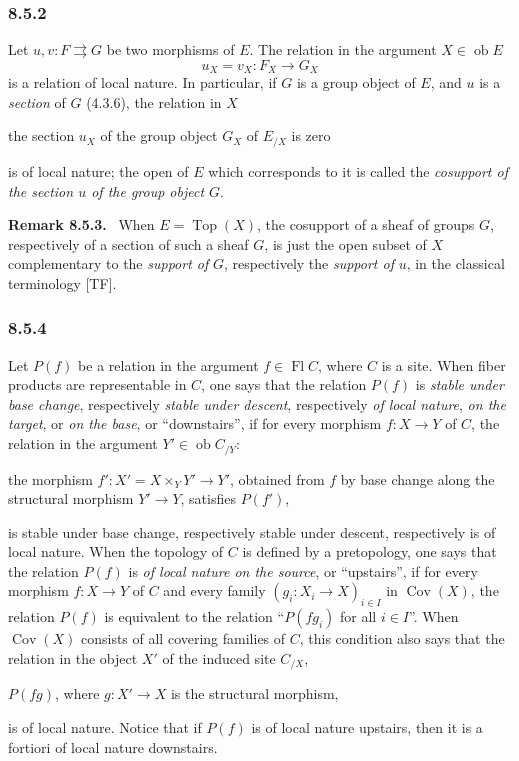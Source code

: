 \documentclass[11pt]{article}
\newcommand{\Top}{\operatorname{Top}}
\newcommand{\Cov}{\operatorname{Cov}}
\newcommand{\ob}{\operatorname{ob}}
\newenvironment{remarktext}[1]{\par\medskip\noindent\textbf{#1.}\ }{\par\medskip}
\begin{document}
\subsubsection*{8.5.2}
Let \(u,v:F\rightrightarrows G\) be two morphisms of \(E\). The relation in the argument \(X\in\ob E\)
\[
u_X=v_X:F_X\longrightarrow G_X
\]
is a relation of local nature. In particular, if \(G\) is a group object of \(E\), and \(u\) is a \emph{section} of \(G\) (4.3.6), the relation in \(X\)
\begin{center}
the section \(u_X\) of the group object \(G_X\) of \(E_{/X}\) is zero
\end{center}
is of local nature; the open of \(E\) which corresponds to it is called the \emph{cosupport of the section \(u\) of the group object \(G\)}.

\begin{remarktext}{Remark 8.5.3}
When \(E=\Top(X)\), the cosupport of a sheaf of groups \(G\), respectively of a section of such a sheaf \(G\), is just the open subset of \(X\) complementary to the \emph{support of} \(G\), respectively the \emph{support of} \(u\), in the classical terminology [TF].
\end{remarktext}

\subsubsection*{8.5.4}
Let \(P(f)\) be a relation in the argument \(f\in\operatorname{Fl} C\), where \(C\) is a site. When fiber products are representable in \(C\), one says that the relation \(P(f)\) is \emph{stable under base change}, respectively \emph{stable under descent}, respectively \emph{of local nature}, \emph{on the target}, or \emph{on the base}, or ``downstairs'', if for every morphism \(f:X\to Y\) of \(C\), the relation in the argument \(Y'\in\ob C_{/Y}\):
\begin{center}
the morphism \(f':X'=X\times_Y Y'\to Y'\), obtained from \(f\) by base change along the structural morphism \(Y'\to Y\), satisfies \(P(f')\),
\end{center}
is stable under base change, respectively stable under descent, respectively is of local nature. When the topology of \(C\) is defined by a pretopology, one says that the relation \(P(f)\) is \emph{of local nature on the source}, or ``upstairs'', if for every morphism \(f:X\to Y\) of \(C\) and every family \((g_i:X_i\to X)_{i\in I}\) in \(\Cov(X)\), the relation \(P(f)\) is equivalent to the relation ``\(P(fg_i)\) for all \(i\in I\)''. When \(\Cov(X)\) consists of all covering families of \(C\), this condition also says that the relation in the object \(X'\) of the induced site \(C_{/X}\),
\begin{center}
\(P(fg)\), where \(g:X'\to X\) is the structural morphism,
\end{center}
is of local nature. Notice that if \(P(f)\) is of local nature upstairs, then it is a fortiori of local nature downstairs.
\end{document}
